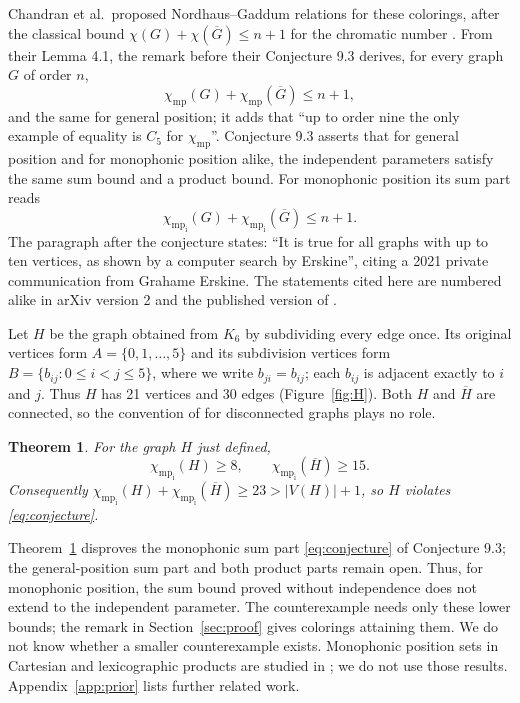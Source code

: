 \documentclass[11pt]{article}
\newtheorem{theorem}{Theorem}
\theoremstyle{remark}
\newcommand{\chimp}{\chi_{\mathrm{mp}_{\mathrm{i}}}}
\begin{document}
Chandran et al.\ proposed Nordhaus--Gaddum relations for these
colorings, after the classical bound $\chi(G)+\chi(\overline G)\leq n+1$
for the chromatic number \cite{nordhaus}. From their Lemma 4.1, the remark
before their Conjecture 9.3 derives, for every graph $G$ of order $n$,
\[
 \chi_{\mathrm{mp}}(G)+\chi_{\mathrm{mp}}(\overline G)\leq n+1,
\]
and the same for general position; it adds that ``up to order nine the
only example of equality is $C_5$ for $\chi_{\mathrm{mp}}$''.
Conjecture 9.3 asserts that for general position and for monophonic
position alike, the independent parameters satisfy the same sum bound
and a product bound. For monophonic position its sum part reads
\begin{equation}\label{eq:conjecture}
 \chimp(G)+\chimp(\overline G)\leq n+1.
\end{equation}
The paragraph after the conjecture states: ``It is true for all graphs
with up to ten vertices, as shown by a computer search by Erskine'',
citing a 2021 private communication from Grahame Erskine. The statements
cited here are numbered alike in arXiv version 2 and the published
version of \cite{position}.

Let $H$ be the graph obtained from $K_6$ by subdividing every edge once.
Its original vertices form $A=\{0,1,\ldots,5\}$ and its subdivision
vertices form $B=\{b_{ij}:0\leq i<j\leq5\}$, where we write
$b_{ji}=b_{ij}$; each $b_{ij}$ is adjacent exactly to $i$ and $j$. Thus
$H$ has 21 vertices and 30 edges (Figure~\ref{fig:H}). Both $H$ and
$\overline H$ are connected, so the convention of \cite{position} for
disconnected graphs plays no role.

\begin{theorem}\label{thm:main}
For the graph $H$ just defined,
\[
 \chimp(H)\geq8,\qquad \chimp(\overline H)\geq15.
\]
Consequently $\chimp(H)+\chimp(\overline H)\geq23>|V(H)|+1$, so $H$
violates \eqref{eq:conjecture}.
\end{theorem}

Theorem~\ref{thm:main} disproves the monophonic sum part
\eqref{eq:conjecture} of Conjecture 9.3; the general-position sum part
and both product parts remain open. Thus, for monophonic position, the
sum bound proved without independence does not extend to the
independent parameter. The counterexample needs only these lower
bounds; the remark in Section~\ref{sec:proof} gives colorings attaining
them. We do not know
whether a smaller counterexample exists. Monophonic position sets in
Cartesian and lexicographic products are studied in \cite{products}; we
do not use those results. Appendix~\ref{app:prior} lists further related
work.
\end{document}
